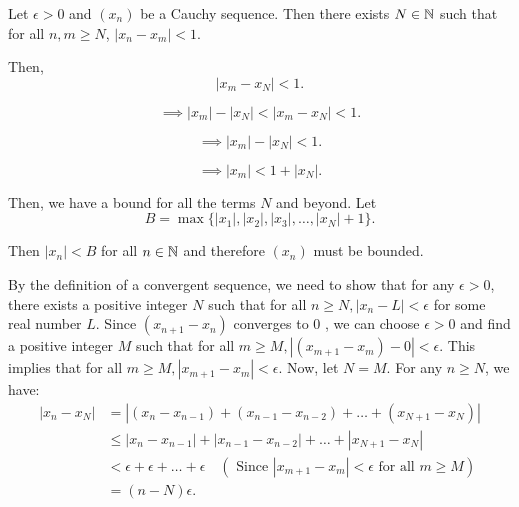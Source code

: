 \documentclass{report}
\begin{document}
\bigskip
{}

\bigskip
\bigskip
{}

Let $\epsilon >0$ and $(x_n)$ be a Cauchy sequence. Then there exists $N \in \NN$ such that for all $n,m \geq N$, $\left| x_n - x_m\right| < 1.$ 

Then, 
 $$ \left|x_m - x_N\right| < 1.$$

$$ \implies \left| x_m \right| - \left|x_N\right| < \left| x_m - x_N\right| < 1.$$


$$ \implies \left| x_m \right| - \left|x_N\right|  < 1.$$

$$ \implies \left| x_m \right| < 1 + \left|x_N\right|.$$


Then, we have a bound for all the terms $N$ and beyond. Let $$ B = \max\{|x_1|, |x_2|, |x_3|, \dots, |x_N| + 1\}.$$

Then $|x_n| < B$ for all $n \in \NN$ and therefore $(x_n)$ must be bounded.

\bigskip

By the definition of a convergent sequence, we need to show that for any $\epsilon>0$, there exists a positive integer $N$ such that for all $n \geq N,\left|x_n-L\right|<\epsilon$ for some real number $L$.
Since $\left(x_{n+1}-x_n\right)$ converges to 0 , we can choose $\epsilon>0$ and find a positive integer $M$ such that for all $m \geq M,\left|\left(x_{m+1}-x_m\right)-0\right|<\epsilon$. This implies that for all $m \geq M,\left|x_{m+1}-x_m\right|<\epsilon$.
Now, let $N=M$. For any $n \geq N$, we have:
$$
\begin{aligned}
\left|x_n-x_N\right| & =\left|\left(x_n-x_{n-1}\right)+\left(x_{n-1}-x_{n-2}\right)+\ldots+\left(x_{N+1}-x_N\right)\right| \\
& \leq\left|x_n-x_{n-1}\right|+\left|x_{n-1}-x_{n-2}\right|+\ldots+\left|x_{N+1}-x_N\right| \\
& <\epsilon+\epsilon+\ldots+\epsilon \quad\left(\text { Since }\left|x_{m+1}-x_m\right|<\epsilon \text { for all } m \geq M\right) \\
& =(n-N) \epsilon .
\end{aligned}
$$
\end{document}
